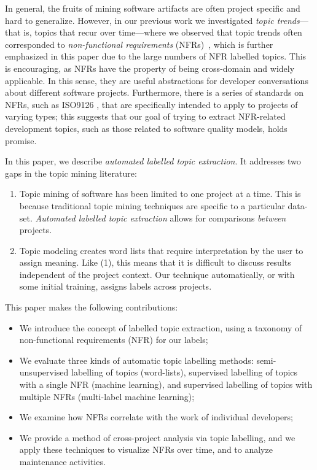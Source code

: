 \documentclass[smallextended]{svjour3}       %
\begin{document}
In general, the fruits of mining software artifacts are often project
specific and hard to generalize.  
However, in our previous work we
investigated \emph{topic trends}---that is, topics that recur over
time---where we observed that topic trends often corresponded to
\emph{non-functional requirements} (NFRs)~\cite{Hindle09ICSM}, which is
further emphasized in this paper due to the large numbers of NFR
labelled topics.  
This is encouraging, as NFRs have the property of being cross-domain
and widely applicable. 
In this sense, they are useful abstractions for developer
conversations about different software projects.  
Furthermore, there is a series of standards on NFRs, such as ISO9126 \cite{iso9126}, that are specifically intended to apply to projects of varying
types; this suggests that our goal of trying to extract NFR-related development topics, such as those related to software quality models, holds promise.

In this paper, we describe \emph{automated labelled topic extraction}. It addresses two gaps in the topic mining literature:
\begin{enumerate}
  \item Topic mining of software has been limited to one project at a time. 
This is because traditional topic mining techniques are specific to a particular data-set. 
\textit{Automated labelled topic extraction} allows for comparisons \textit{between} projects. 
  \item Topic modeling creates word lists that require interpretation by the user to assign meaning. 
Like (1), this means
that it is difficult to discuss results independent of the project context. 
Our technique automatically, or with some initial training, assigns labels across projects.
\end{enumerate}

This paper makes the following contributions: 
\begin{itemize}
\item We introduce the concept of labelled topic extraction, using a taxonomy of non-functional requirements (NFR) for our labels; 
\item We evaluate three kinds of automatic topic labelling methods:
  semi-unsupervised labelling  of topics (word-lists), supervised labelling of
  topics with a single NFR (machine learning), 
  and supervised labelling of topics with multiple NFRs (multi-label
  machine learning);
\item We examine how NFRs correlate with the work of individual developers;
\item We provide a method of cross-project analysis via topic labelling, and
we apply these techniques to visualize NFRs over time, and to analyze maintenance activities.

\end{itemize}
\end{document}
